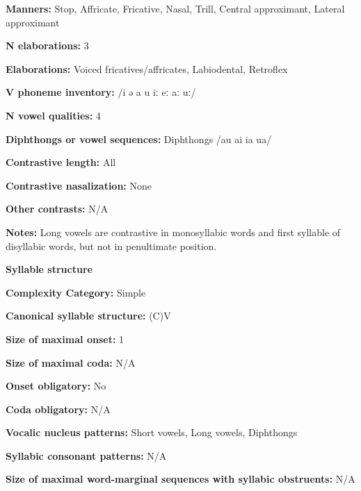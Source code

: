 \textbf{Manners:} Stop, Affricate, Fricative, Nasal, Trill, Central approximant, Lateral approximant



\textbf{N elaborations:} 3



\textbf{Elaborations:} Voiced fricatives/affricates, Labiodental, Retroflex



\textbf{V phoneme inventory:} /i ə a u iː eː aː uː/



\textbf{N vowel qualities:} 4



\textbf{Diphthongs or vowel sequences:} Diphthongs /au ai ia ua/



\textbf{Contrastive length:} All



\textbf{Contrastive nasalization:} None



\textbf{Other contrasts:} N/A



\textbf{Notes:} Long vowels are contrastive in monosyllabic words and first syllable of disyllabic words, but not in penultimate position.



\textbf{Syllable structure}



\textbf{Complexity Category:} Simple



\textbf{Canonical syllable structure:} (C)V \citep[211-18]{Chen2006}



\textbf{Size of maximal onset:} 1



\textbf{Size of maximal coda:} N/A



\textbf{Onset obligatory:} No



\textbf{Coda obligatory:} N/A



\textbf{Vocalic nucleus patterns:} Short vowels, Long vowels, Diphthongs



\textbf{Syllabic consonant patterns:} N/A



\textbf{Size of maximal word{}-marginal sequences with syllabic obstruents:} N/A



